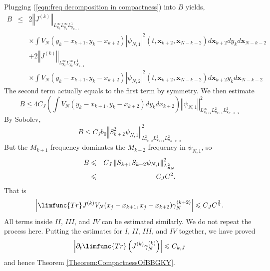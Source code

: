 \documentclass[12pt,letterpaper,leqno]{amsart}
\theoremstyle{plain}
\numberwithin{equation}{section}
\numberwithin{theorem}{section}
\numberwithin{proposition}{section}
\numberwithin{lemma}{section}
\numberwithin{corollary}{section}
\begin{document}
Plugging (\ref{eqn:freq decomposition in compactness}) into $B$ yields,%
\begin{eqnarray*}
B &\leqslant &2\left\Vert J^{(k)}\right\Vert _{L_{\mathbf{x}_{k}}^{\infty
}L_{y_{k}}^{\infty }L_{\mathbf{y}_{k-1}}^{1}} \\
&&\times \int V_{N}(y_{k}-x_{k+1},y_{k}-x_{k+2})\left\vert \psi
_{N,1}\right\vert ^{2}(t,\mathbf{x}_{k+2},\mathbf{x}_{N-k-2})d\mathbf{x}%
_{k+2}dy_{k}d\mathbf{x}_{N-k-2} \\
&&+2\left\Vert J^{(k)}\right\Vert _{L_{\mathbf{x}_{k}}^{\infty
}L_{y_{k}}^{\infty }L_{\mathbf{y}_{k-1}}^{1}} \\
&&\times \int V_{N}(y_{k}-x_{k+1},y_{k}-x_{k+2})\left\vert \psi
_{N,2}\right\vert ^{2}(t,\mathbf{x}_{k+2},\mathbf{x}_{N-k-2})d\mathbf{x}%
_{k+2}y_{k}d\mathbf{x}_{N-k-2}
\end{eqnarray*}%
The second term actually equals to the first term by symmetry. We then
estimate%
\begin{equation*}
B\leqslant 4C_{J}\left( \int
V_{N}(y_{k}-x_{k+1},y_{k}-x_{k+2})dy_{k}dx_{k+2}\right) \left\Vert \psi
_{N,1}\right\Vert _{L_{x_{k+2}}^{\infty }L_{\mathbf{x}_{k+1}}^{2}L_{\mathbf{x%
}_{N-k-2}}^{2}}^{2}
\end{equation*}%
By Sobolev,%
\begin{equation*}
B\leqslant C_{J}b_{0}\left\Vert S_{k+2}^{2}\psi _{N,1}\right\Vert
_{L_{x_{k+2}}^{2}L_{\mathbf{x}_{k+1}}^{2}L_{\mathbf{x}_{N-k-2}}^{2}}^{2}
\end{equation*}%
But the $M_{k+1}$ frequency dominates the $M_{k+2}$ frequency in $\psi
_{N,1} $, so 
\begin{eqnarray*}
B &\leqslant &C_{J}\left\Vert S_{k+1}S_{k+2}\psi _{N,1}\right\Vert _{L_{%
\mathbf{x}_{N}}^{2}}^{2} \\
&\leqslant &C_{J}C^{2}.
\end{eqnarray*}%
That is%
\begin{equation*}
\left\vert \limfunc{Tr}J^{(k)}V_{N}(x_{j}-x_{k+1},x_{j}-x_{k+2})\gamma
_{N}^{(k+2)}\right\vert \leqslant C_{J}C^{\frac{3}{2}}\text{.}
\end{equation*}%
All terms inside $II$, $III$, and $IV$ can be estimated similarly. We do not
repeat the process here. Putting the estimates for $I$, $II$, $III$, and $IV$
together, we have proved 
\begin{equation*}
\left\vert \partial _{t}\limfunc{Tr}\left( J^{(k)}\gamma _{N}^{(k)}\right)
\right\vert \leqslant C_{k,J}
\end{equation*}%
and hence Theorem \ref{Theorem:CompactnessOfBBGKY}.
\end{document}
